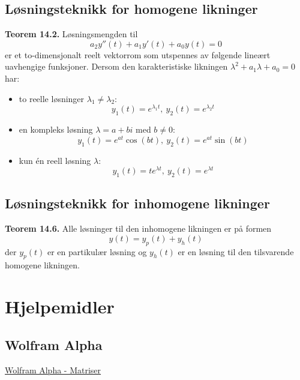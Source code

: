 \documentclass{article}
\begin{document}
\subsection{Løsningsteknikk for homogene likninger}
\textbf{Teorem 14.2.} Løsningsmengden til
\[ a_2y''(t) + a_1y'(t) + a_0y(t) = 0 \]
er et to-dimensjonalt reelt vektorrom som utspennes av følgende lineært uavhengige funksjoner. Dersom den karakteristiske likningen $\lambda ^2 + a_1\lambda + a_0 = 0$ har:
\begin{itemize}
    \item to reelle løsninger $\lambda_1 \neq \lambda_2$:
    \[ y_1(t) = e^{\lambda_1 t}, \ y_2(t) = e^{\lambda_2 t} \]
    \item en kompleks løsning $\lambda = a + bi$ med $b \neq 0$:
    \[ y_1(t) = e^{at}\cos{(bt)}, \ y_2(t) = e^{at}\sin{(bt)} \]
    \item kun én reell løsning $\lambda$:
    \[ y_1(t) = te^{\lambda t}, \ y_2(t) = e^{\lambda t} \]
\end{itemize}


\subsection{Løsningsteknikk for inhomogene likninger}
\textbf{Teorem 14.6.} Alle løsninger til den inhomogene likningen er på formen
\[ y(t) = y_p(t) + y_h(t) \]
der $y_p(t)$ er en partikulær løsning og $y_h(t)$ er en løsning til den tilsvarende homogene likningen.




\clearpage
\section{Hjelpemidler}


\subsection{Wolfram Alpha}
\href{https://www.wolframalpha.com/input/?i=matrices}{Wolfram Alpha - Matriser}
\end{document}
